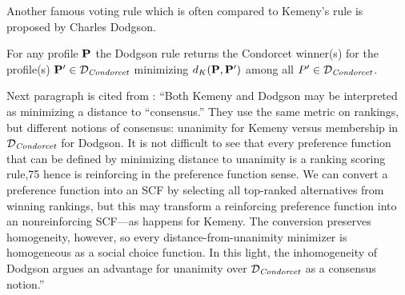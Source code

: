 Another famous voting rule which is often compared to Kemeny's rule is proposed by Charles Dodgson.

\begin{definition}
    For any profile $\mathbf{P}$ the Dodgson rule returns the Condorcet winner(s) for the profile(s) $\mathbf{P}' \in \mathcal{D}_\textit{Condorcet}$ minimizing $d_K (\mathbf{P},\mathbf{P}')$ among all $P' \in \mathcal{D}_\textit{Condorcet}$.
\end{definition}

Next paragraph is cited from \textcite{moulinHandbookComputationalSocial2016}:
``Both Kemeny and Dodgson may be interpreted as minimizing a distance to “consensus.” They use the same metric on rankings, but different notions of consensus: unanimity for Kemeny versus membership in $\mathcal{D}_\textit{Condorcet}$ for Dodgson. It is not difficult to see that every preference function that can be defined by minimizing distance to unanimity is a ranking scoring rule,75 hence is reinforcing in the preference function sense. We can convert a preference function into an SCF by selecting all top-ranked alternatives from winning rankings, but this may transform a reinforcing preference function into an nonreinforcing SCF—as happens for Kemeny. The conversion preserves homogeneity, however, so every distance-from-unanimity minimizer is homogeneous as a social choice function. In this light, the inhomogeneity of Dodgson argues an advantage for unanimity over $\mathcal{D}_\textit{Condorcet}$ as a consensus notion.''